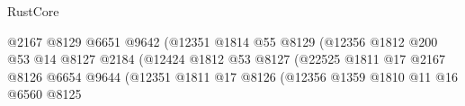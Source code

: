 \begin{lexlean}{RustCore}
\begin{coremodule}
                                                            @2167
                                                            @8129
                                                            @6651
                                                            @9642
                                                            (@12351
                                                              @1814
                                                              @55
                                                              @8129
                                                              (@12356
                                                                @1812
                                                                @200
                                                                @53
                                                                @14
                                                                @8127
                                                                @2184
                                                                (@12424
                                                                  @1812
                                                                  @53
                                                                  @8127
                                                                  (@22525
                                                                    @1811
                                                                    @17
                                                                    @2167
                                                                    @8126
                                                                    @6654
                                                                    @9644
                                                                    (@12351
                                                                      @1811
                                                                      @17
                                                                      @8126
                                                                      (@12356
                                                                        @1359
                                                                        @1810
                                                                        @11
                                                                        @16
                                                                        @6560
                                                                        @8125

\end{coremodule}
\end{lexlean}
